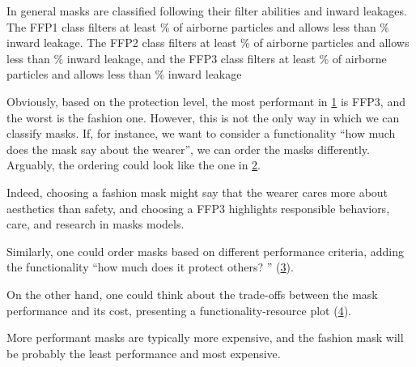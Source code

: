\begin{figure}[h!]
    \centering
    \caption{}
    \label{fig:masks_covid}
\end{figure}

In general masks are classified following their filter abilities and inward leakages.
The FFP1 class filters at least \unit[80]{\%} of airborne particles and allows less than \unit[22]{\%} inward leakage.
The FFP2 class filters at least \unit[96]{\%} of airborne particles and allows less than \unit[8]{\%} inward leakage, and the FFP3 class filters at least \unit[99]{\%} of airborne particles and allows less than \unit[2]{\%} inward leakage

Obviously, based on the protection level, the most performant in \cref{fig:masks_covid} is FFP3, and the worst is the fashion one.
However, this is not the only way in which we can classify masks.
If, for instance, we want to consider a functionality ``how much does the mask say about the wearer'', we can order the masks differently.
Arguably, the ordering could look like the one in \cref{fig:masks_expressive}.

\begin{figure}[h!]
    \centering
    \caption{}
    \label{fig:masks_expressive}
\end{figure}

Indeed, choosing a fashion mask might say that the wearer cares more about aesthetics than safety, and choosing a FFP3 highlights responsible behaviors, care, and research in masks models.

Similarly, one could order masks based on different performance criteria, adding the functionality ``how much does it protect others?
'' (\cref{fig:masks_others}).

\begin{figure}[h!]
    \centering
    \caption{}
    \label{fig:masks_others}
\end{figure}

On the other hand, one could think about the trade-offs between the mask performance and its cost, presenting a functionality-resource plot (\cref{fig:masks_price}).

\begin{figure}[h!]
    \centering
    \caption{}
    \label{fig:masks_price}
\end{figure}

More performant masks are typically more expensive, and the fashion mask will be probably the least performance and most expensive.

